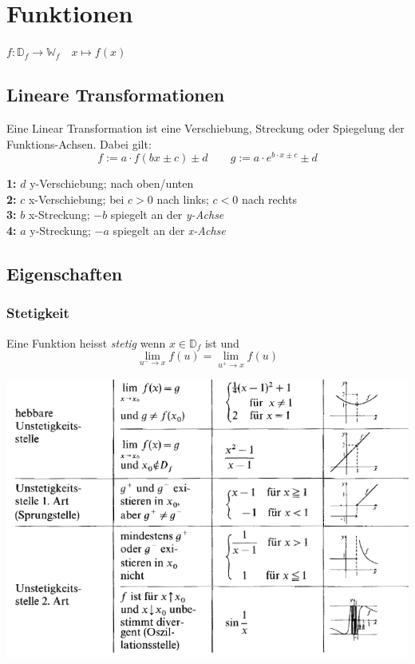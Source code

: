 \textbf{}
\section{Funktionen}
$ f:  \mathbb{D}_f \to \mathbb{W}_f \quad x \mapsto f(x) $

\subsection{Lineare Transformationen}
Eine Linear Transformation ist eine Verschiebung, Streckung oder Spiegelung der Funktions-Achsen. Dabei gilt:
\[ f := a \cdot f(bx \pm c) \pm d \qquad g := a \cdot e^{b\cdot x \pm c} \pm d\]

\noindent \textbf{1:} $d$ y-Verschiebung; nach oben/unten \\
\textbf{2:} $c$ x-Verschiebung; bei $c>0$ nach links; $c<0$ nach rechts \\
\textbf{3:} $b$ x-Streckung; $-b$ spiegelt an der\textit{ y-Achse} \\
\textbf{4:} $a$ y-Streckung; $-a$ spiegelt an der \textit{x-Achse }\\

\subsection{Eigenschaften}
\subsubsection{Stetigkeit}
Eine Funktion heisst \textit{stetig} wenn $x \in \mathbb{D}_f$ ist und \[\lim\limits_{u^- \rightarrow x}f(u) = \lim\limits_{u^+ \rightarrow x}f(u)\]

\noindent\includegraphics[width=\columnwidth]{./Images/unstetigkeit.png}

